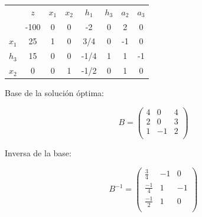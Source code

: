 \begin{center}
\begin{tabular}{c|c|cccccc|}
 & $z$ & $x_1$ & $x_2$ & $h_1$ & $h_3$ & $a_2$ & $a_3$\\ 
 & -100 & 0 & 0 & -2 & 0 & 2 & 0 \\ 
\hline
$x_1$ & 25  & 1 & 0 & 3/4 & 0 & -1 & 0\\ 
$h_3$ & 15  & 0 & 0 & -1/4 & 1 & 1 & -1\\ 
$x_2$ & 0  & 0 & 1 & -1/2 & 0 & 1 & 0\\ 
\hline
\end{tabular}
\end{center}



Base de la solución óptima:

\begin{equation}
B = \begin{pmatrix}
4 & 0 & 4\\
2 & 0 & 3\\
1 & -1 & 2\\
\end{pmatrix}
\end{equation}


Inversa de la base:

\begin{equation}
B^{-1} = 
\begin{pmatrix}
\frac{3}{4} & -1 & 0\\
\frac{-1}{4} & 1 & -1\\
\frac{-1}{2} & 1 & 0\\
\end{pmatrix}
\end{equation}